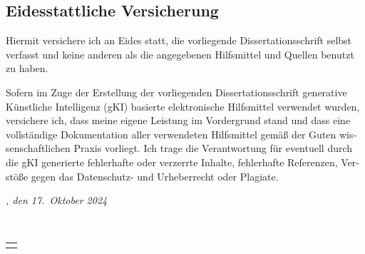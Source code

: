 \begin{otherlanguage}{ngerman}

	\chapter*{Eidesstattliche Versicherung}
	\thispagestyle{empty}
	Hiermit versichere ich an Eides statt, die vorliegende Dissertationsschrift selbst verfasst und
	keine anderen als die angegebenen Hilfsmittel und Quellen benutzt zu haben.
	
	Sofern im Zuge der Erstellung der vorliegenden Dissertationsschrift generative Künstliche
	Intelligenz (gKI) basierte elektronische Hilfsmittel verwendet wurden, versichere ich, dass meine
	eigene Leistung im Vordergrund stand und dass eine vollständige Dokumentation aller
	verwendeten Hilfsmittel gemäß der Guten wissenschaftlichen Praxis vorliegt. Ich trage die
	Verantwortung für eventuell durch die gKI generierte fehlerhafte oder verzerrte Inhalte,
	fehlerhafte Referenzen, Verstöße gegen das Datenschutz- und Urheberrecht oder Plagiate.
	
	
	\bigskip
	
	\noindent\textit{\myLocation, den 17.~Oktober 2024}
	
	\smallskip
	
	\begin{flushright}
		\phantom{add signature here} \phantom{~~~~~~~~~~~~}\\
		\vspace{-0.5cm}
	    \begin{tabular}{m{5cm}}
	        \\ \hline
	        \centering\myName \\
	    \end{tabular}
	\end{flushright}
	
\end{otherlanguage}
